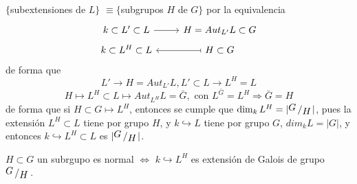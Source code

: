 \begin{teo}[de Galois]
    $\{$subextensiones de $L\}$ $\equiv \{$subgrupos $H$ de $G\}$ por la equivalencia
    $$\bt k \subset L' \subset L \rar & H = Aut_{L'} L \subset G  \\[-5mm] k \subset L^H \subset L & \arrow[mapsto]{l}  H \subset G \et$$ de forma que 
    $$L' \longrightarrow H = Aut_{L'} L , L' \subset L \longrightarrow L^H = L$$
    $$H \longmapsto L^H \subset L \longmapsto Aut_{L^H} L = \bar G, \text{ con } L^{\bar G} = L^H \Rightarrow \bar G = H$$
     de forma que si $H\subset G \longmapsto L^H$, entonces se cumple que $\dim_k L^H = |\modulo{G}{H}|$, pues la extensi\'on $L^{H} \subset L$ tiene por grupo $H$, y $k \hookrightarrow L$ tiene por grupo $G$, $dim_k L = |G|$, y entonces $k \hookrightarrow L^H \subset L$ es $|\modulo{G}{H}|$.  
\end{teo}
\begin{prop}
    $H \subset G$ un subrgupo es normal $\iff$ $k \hookrightarrow L^H$ es extensi\'on de Galois de grupo $\modulo{G}{H}$. 
\end{prop}
